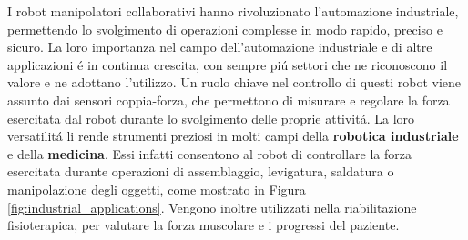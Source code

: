 I robot manipolatori collaborativi hanno rivoluzionato l'automazione industriale, permettendo lo svolgimento
di operazioni complesse in modo rapido, preciso e sicuro. 
La loro importanza nel campo dell'automazione industriale e di altre applicazioni \'{e} in continua crescita, con 
sempre pi\'{u} settori che ne riconoscono il valore e ne adottano l'utilizzo.
Un ruolo chiave nel controllo di questi robot viene assunto dai sensori coppia-forza,
che permettono di misurare e regolare la forza esercitata dal robot durante lo svolgimento delle proprie attivit\'{a}. 
La loro versatilit\'{a} li rende strumenti preziosi in molti campi della \textbf{robotica industriale} e della \textbf{medicina}. 
Essi infatti consentono al robot di controllare la forza esercitata durante operazioni di assemblaggio, levigatura, 
saldatura o manipolazione degli oggetti, come mostrato in Figura \ref{fig:industrial_applications}. 
Vengono inoltre utilizzati nella riabilitazione fisioterapica, per valutare la forza muscolare 
e i progressi del paziente. 
